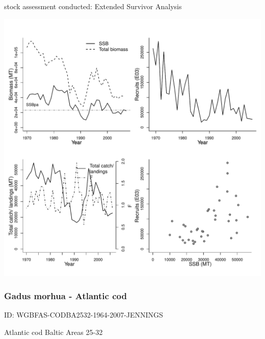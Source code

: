 stock assessment conducted: Extended Survivor Analysis 
\begin{center}
\vspace{-0.2cm}\includegraphics[scale=0.65]{../tex/figures/plot-WGBFAS-CODBA2224-1969-2007-JENNINGS.pdf}
\end{center}

\newpage
\subsubsection{Gadus morhua - Atlantic cod}
ID: WGBFAS-CODBA2532-1964-2007-JENNINGS

Atlantic cod Baltic Areas 25-32 

